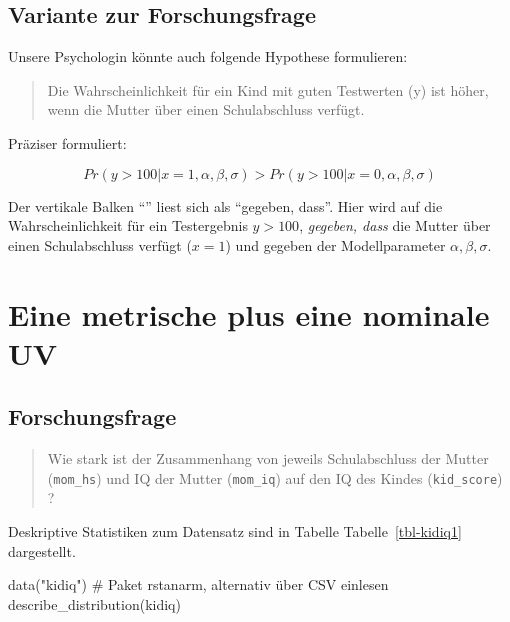 \documentclass[
  a4paper,
  DIV=11]{scrreprt}
\newenvironment{Shaded}{\begin{snugshade}}{\end{snugshade}}
\newcommand{\CommentTok}[1]{\textcolor[rgb]{0.37,0.37,0.37}{#1}}
\newcommand{\FunctionTok}[1]{\textcolor[rgb]{0.28,0.35,0.67}{#1}}
\newcommand{\NormalTok}[1]{\textcolor[rgb]{0.00,0.23,0.31}{#1}}
\newcommand{\StringTok}[1]{\textcolor[rgb]{0.13,0.47,0.30}{#1}}
\theoremstyle{definition}
\theoremstyle{remark}
\begin{document}
\hypertarget{variante-zur-forschungsfrage}{%
\subsection{Variante zur
Forschungsfrage}\label{variante-zur-forschungsfrage}}

Unsere Psychologin könnte auch folgende Hypothese formulieren:

\begin{quote}
Die Wahrscheinlichkeit für ein Kind mit guten Testwerten (y) ist höher,
wenn die Mutter über einen Schulabschluss verfügt.
\end{quote}

Präziser formuliert:

\[Pr(y > 100|x=1, \alpha, \beta, \sigma) > Pr(y > 100|x=0, \alpha, \beta, \sigma)\]

Der vertikale Balken ``\textbar{}'' liest sich als ``gegeben, dass''.
Hier wird auf die Wahrscheinlichkeit für ein Testergebnis \(y>100\),
\emph{gegeben, dass} die Mutter über einen Schulabschluss verfügt
(\(x=1\)) und gegeben der Modellparameter \(\alpha, \beta, \sigma\).

\hypertarget{eine-metrische-plus-eine-nominale-uv}{%
\section{Eine metrische plus eine nominale
UV}\label{eine-metrische-plus-eine-nominale-uv}}

\hypertarget{forschungsfrage-1}{%
\subsection{Forschungsfrage}\label{forschungsfrage-1}}

\begin{quote}
Wie stark ist der Zusammenhang von jeweils Schulabschluss der Mutter
(\texttt{mom\_hs}) und IQ der Mutter (\texttt{mom\_iq}) auf den IQ des
Kindes (\texttt{kid\_score}) ?
\end{quote}

Deskriptive Statistiken zum Datensatz sind in Tabelle
Tabelle~\ref{tbl-kidiq1} dargestellt.

\begin{Shaded}
\begin{Highlighting}[]
\FunctionTok{data}\NormalTok{(}\StringTok{"kidiq"}\NormalTok{)  }\CommentTok{\# Paket rstanarm, alternativ über CSV einlesen}
\FunctionTok{describe\_distribution}\NormalTok{(kidiq)}
\end{Highlighting}
\end{Shaded}
\end{document}
